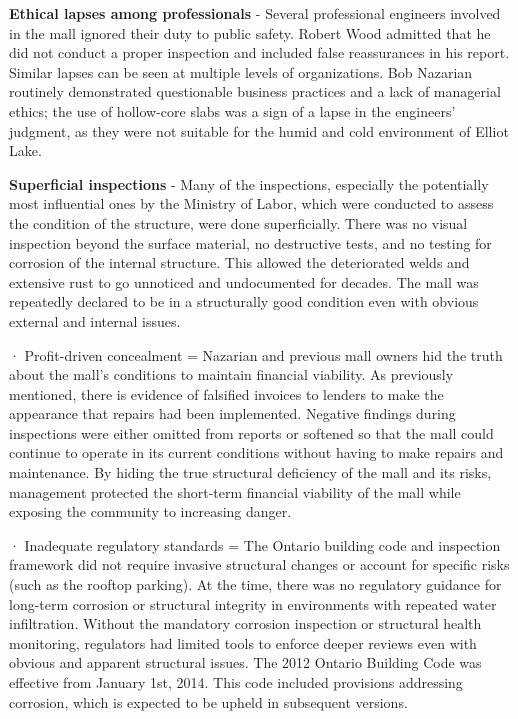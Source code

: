 \documentclass[12pt]{article}
\begin{document}
\textbf{Ethical lapses among professionals} - Several professional engineers involved in the mall ignored their duty to public safety. Robert Wood admitted that he did not conduct a proper inspection and included false reassurances in his report. Similar lapses can be seen at multiple levels of organizations. Bob Nazarian routinely demonstrated questionable business practices and a lack of managerial ethics; the use of hollow-core slabs was a sign of a lapse in the engineers' judgment, as they were not suitable for the humid and cold environment of Elliot Lake. 

\textbf{Superficial inspections} - Many of the inspections, especially the potentially most influential ones by the Ministry of Labor, which were conducted to assess the condition of the structure, were done superficially. There was no visual inspection beyond the surface material, no destructive tests, and no testing for corrosion of the internal structure. This allowed the deteriorated welds and extensive rust to go unnoticed and undocumented for decades. The mall was repeatedly declared to be in a structurally good condition even with obvious external and internal issues.


 

 


 · Profit-driven concealment = Nazarian and previous mall owners hid the truth about the mall's conditions to maintain financial viability. As previously mentioned, there is evidence of falsified invoices to lenders to make the appearance that repairs had been implemented. Negative findings during inspections were either omitted from reports or softened so that the mall could continue to operate in its current conditions without having to make repairs and maintenance. By hiding the true structural deficiency of the mall and its risks, management protected the short-term financial viability of the mall while exposing the community to increasing danger.

 

 · Inadequate regulatory standards = The Ontario building code and inspection framework did not require invasive structural changes or account for specific risks (such as the rooftop parking). At the time, there was no regulatory guidance for long-term corrosion or structural integrity in environments with repeated water infiltration. Without the mandatory corrosion inspection or structural health monitoring, regulators had limited tools to enforce deeper reviews even with obvious and apparent structural issues. The 2012 Ontario Building Code was effective from January 1st, 2014. This code included provisions addressing corrosion, which is expected to be upheld in subsequent versions. 
\end{document}
